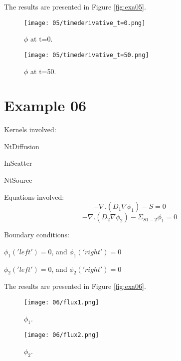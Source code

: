 \documentclass[11pt,letterpaper]{article}
\begin{document}
The results are presented in Figure \ref{fig:exa05}.
\begin{figure*}[!h]
	\centering
	\begin{subfigure}[t]{0.4\textwidth}
		\centering
		\texttt{[image: 05/timederivative\_t=0.png]} 
		\caption{$\phi$ at t=0.}
		\label{fig:exa01-flux1}
	\end{subfigure}
	\vspace{1cm}
	\begin{subfigure}[t]{0.4\textwidth}
		\centering
		\texttt{[image: 05/timederivative\_t=50.png]} 
		\caption{$\phi$ at t=50.}
		\label{fig:exa01-flux2}
	\end{subfigure}
	\hfill
	\caption{Flux.}
	\label{fig:exa05}
\end{figure*}

\newpage
\section{Example 06}

Kernels involved:
\begin{description}[font=$\bullet$\scshape\bfseries]
	\item[] NtDiffusion
	\item[] InScatter
	\item[] NtSource
\end{description}

Equations involved:
\begin{equation}
-\nabla.(D_{1}\nabla \phi_{1})-S=0
\end{equation}
\begin{equation}
-\nabla.(D_{2}\nabla \phi_{2})-\Sigma_{S1-2}\phi_{1}=0
\end{equation}

Boundary conditions:
\begin{description}[]
	\item[] $\phi_{1}('left')=0$, and $\phi_{1}('right')=0$
	\item[] $\phi_{2}('left')=0$, and $\phi_{2}('right')=0$
\end{description}

The results are presented in Figure \ref{fig:exa06}.
\begin{figure*}[!h]
	\centering
	\begin{subfigure}[t]{0.4\textwidth}
		\centering
		\texttt{[image: 06/flux1.png]} 
		\caption{$\phi_{1}$.}
		\label{fig:exa06-flux1}
	\end{subfigure}
	\vspace{1cm}
	\begin{subfigure}[t]{0.4\textwidth}
		\centering
		\texttt{[image: 06/flux2.png]} 
		\caption{$\phi_{2}$.}
		\label{fig:exa06-flux2}
	\end{subfigure}
	\hfill
	\caption{Flux.}
	\label{fig:exa06}
\end{figure*}
\end{document}
